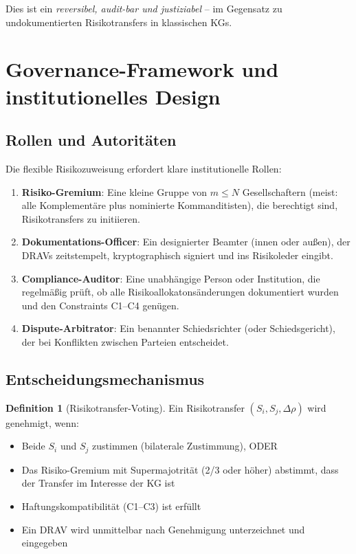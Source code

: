 \documentclass[a4paper,12pt]{article}
\theoremstyle{definition}
\newtheorem{definition}{Definition}
\begin{document}
Dies ist ein \emph{reversibel, audit-bar und justiziabel} -- im Gegensatz zu undokumentierten Risikotransfers in klassischen KGs.

\section{Governance-Framework und institutionelles Design}

\subsection{Rollen und Autoritäten}

Die flexible Risikozuweisung erfordert klare institutionelle Rollen:

\begin{enumerate}
    \item \textbf{Risiko-Gremium}: Eine kleine Gruppe von $m \leq N$ Gesellschaftern (meist: alle Komplementäre plus nominierte Kommanditisten), die berechtigt sind, Risikotransfers zu initiieren.
    
    \item \textbf{Dokumentations-Officer}: Ein designierter Beamter (innen oder außen), der DRAVs zeitstempelt, kryptographisch signiert und ins Risikoleder eingibt.
    
    \item \textbf{Compliance-Auditor}: Eine unabhängige Person oder Institution, die regelmäßig prüft, ob alle Risikoallokatonsänderungen dokumentiert wurden und den Constraints C1--C4 genügen.
    
    \item \textbf{Dispute-Arbitrator}: Ein benannter Schiedsrichter (oder Schiedsgericht), der bei Konflikten zwischen Parteien entscheidet.
\end{enumerate}

\subsection{Entscheidungsmechanismus}

\begin{definition}[Risikotransfer-Voting]
Ein Risikotransfer $(S_i, S_j, \Delta\rho)$ wird genehmigt, wenn:
\begin{itemize}
    \item Beide $S_i$ und $S_j$ zustimmen (bilaterale Zustimmung), ODER
    \item Das Risiko-Gremium mit Supermajotrität (2/3 oder höher) abstimmt, dass der Transfer im Interesse der KG ist
    \item Haftungskompatibilität (C1--C3) ist erfüllt
    \item Ein DRAV wird unmittelbar nach Genehmigung unterzeichnet und eingegeben
\end{itemize}
\end{definition}
\end{document}
